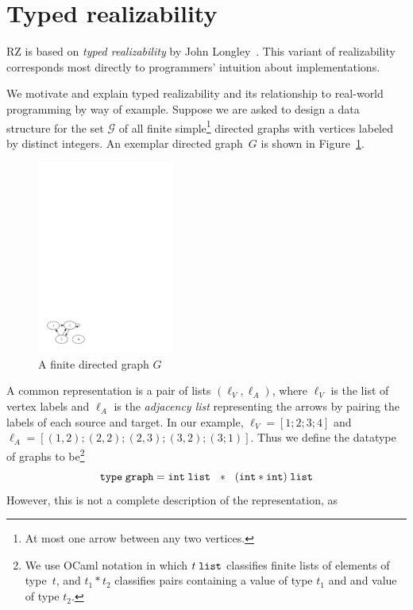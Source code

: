 \section{Typed realizability}
\label{sec:typed-realizability}

RZ is based on \emph{typed realizability} by John
Longley~\cite{Longley99}.   This variant of realizability corresponds most
directly to programmers' intuition about implementations.

We motivate and explain typed realizability and its relationship to
real-world programming by way of example. Suppose we are asked to
design a data structure for the set $\mathcal{G}$ of all finite
simple\footnote{At most one arrow between any two vertices.}
directed graphs with vertices labeled by distinct integers. An exemplar
directed graph~$G$ is shown in Figure~\ref{fig:digraph}.
%
\begin{figure}
  \centering
  \includegraphics[width=0.4\textwidth]{digraph}
  \caption{A finite directed graph $G$}
  \label{fig:digraph}
\end{figure}
%
A common representation is a pair of lists $(\ell_V, \ell_A)$, where
$\ell_V$ is the list of vertex labels and $\ell_A$ is the \emph{adjacency list} 
representing the arrows by pairing the labels of each source and target.
In our example, $\ell_V = [1; 2;
3; 4]$ and $\ell_A = [(1,2); (2,2); (2,3); (3,2); (3;1)]$. Thus we
define the datatype of graphs to be\footnote{We use OCaml notation in
  which $t\;\mathtt{list}$ classifies finite lists of elements of type~$t$, and
  $t_1 * t_2$ classifies pairs containing a value of type $t_1$ and and 
  value of type $t_2$.}
%
\begin{equation*}
  \mathtt{type}\; \mathtt{graph} = \mathtt{int}\;\mathtt{list} \ \ * \ \ (\mathtt{int} * \mathtt{int})\;\mathtt{list}
\end{equation*}
%
However, this is not a complete description of the representation, as
